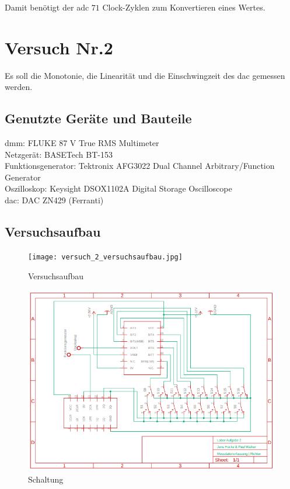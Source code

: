 \documentclass[12pt, a4paper, ngerman]{article}
\begin{document}
Damit benötigt der \ac{adc} $71$ Clock-Zyklen zum Konvertieren eines Wertes.


\section{Versuch Nr.2}

Es soll die Monotonie, die Linearität und die Einschwingzeit des \ac{dac} gemessen werden.

\subsection{Genutzte Geräte und Bauteile}

\acl{dmm}: FLUKE 87 V True RMS Multimeter \\
Netzgerät: BASETech BT-153 \\
Funktionsgenerator: Tektronix AFG3022 Dual Channel Arbitrary/Function Generator \\
Oszilloskop: Keysight DSOX1102A Digital Storage Oscilloscope \\
\ac{dac}: DAC ZN429 (Ferranti)

\subsection{Versuchsaufbau}


\begin{figure}%
  \centering
  \begin{minipage}[b]{0.49\textwidth}
    \texttt{[image: versuch\_2\_versuchsaufbau.jpg]}
    \caption{Versuchsaufbau}
    \label{abb:aufbau2}
  \end{minipage}
  \hfill
  \begin{minipage}[b]{0.49\textwidth}
    \includegraphics[width=\textwidth]{schaltplan_versuch_2.png}
    \caption{Schaltung}
    \label{abb:schaltung2}
  \end{minipage}
\end{figure}
\end{document}

